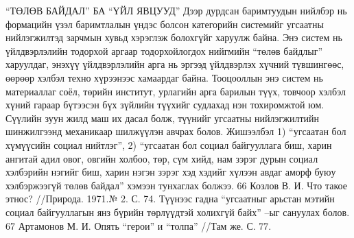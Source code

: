 “ТӨЛӨВ БАЙДАЛ” БА “ҮЙЛ ЯВЦУУД”
Дээр дурдсан баримтуудын нийлбэр нь формацийн үзэл баримтлалын үндэс болсон категорийн системийг угсаатны нийлэгжилтэд зарчмын хувьд хэрэглэж болохгүйг харуулж байна. Энэ систем нь үйлдвэрлэлийн тодорхой аргаар тодорхойлогдох нийгмийн “төлөв байдлыг” харуулдаг, энэхүү үйлдвэрлэлийн арга нь эргээд үйлдвэрлэх хүчний түвшингөөс, өөрөөр хэлбэл техно хүрээнээс хамаардаг байна. Тооцооллын энэ систем нь материаллаг соёл, төрийн институт, урлагийн арга барилын түүх, товчоор хэлбэл хүний гараар бүтээсэн бүх зүйлийн түүхийг судлахад нэн тохиромжтой юм. Сүүлийн зуун жилд маш их дасал болж, түүнийг угсаатны нийлэгжилтийн шинжилгээнд механикаар шилжүүлэн авчрах болов. Жишээлбэл 1) “угсаатан бол хүмүүсийн социал нийтлэг”, 2) “угсаатан бол социал байгууллага биш, харин ангитай адил овог, овгийн холбоо, төр, сүм хийд, нам зэрэг дурын социал хэлбэрийн нэгийг биш, харин нэгэн зэрэг хэд хэдийг хүлээн авдаг аморф буюу хэлбэржээгүй төлөв байдал” хэмээн тунхаглах болжээ. 66 Козлов В. И. Что такое этнос? //Природа. 1971.№ 2. С. 74.
Түүнээс гадна “угсаатныг арьстан мэтийн социал байгууллагын янз бүрийн төрлүүдтэй холихгүй байх” –ыг сануулах болов.
67 Артамонов М. И. Опять “герои” и “толпа” //Там же. С. 77.

